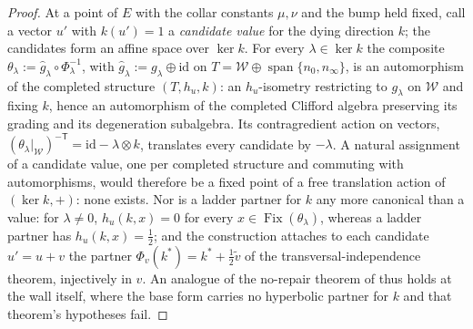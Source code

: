 \documentclass[11pt]{article}
\theoremstyle{definition}
\theoremstyle{plain}
\providecommand{\id}{}\renewcommand{\id}{\mathrm{id}}
\providecommand{\nInf}{}\renewcommand{\nInf}{n_\infty}
\providecommand{\nO}{}\renewcommand{\nO}{n_0}
\providecommand{\shW}{}\renewcommand{\shW}{\mathcal{W}}
\begin{document}
\begin{proof}
At a point of $E$ with the collar constants $\mu, \nu$ and the bump held fixed, call a vector $u'$ with $k(u') = 1$ a \emph{candidate value} for the dying direction $k$; the candidates form an affine space over $\ker k$. For every $\lambda \in \ker k$ the composite $\theta_\lambda := \hat g_\lambda \circ \Phi_\lambda^{-1}$, with $\hat g_\lambda := g_\lambda \oplus \id$ on $T = \shW \oplus \operatorname{span}\{\nO, \nInf\}$, is an automorphism of the completed structure $(T, h_u, k)$: an $h_u$-isometry restricting to $g_\lambda$ on $\shW$ and fixing $k$, hence an automorphism of the completed Clifford algebra preserving its grading and its degeneration subalgebra. Its contragredient action on vectors, $(\theta_\lambda|_{\shW})^{-\mathsf{T}} = \id - \lambda \otimes k$, translates every candidate by $-\lambda$. A natural assignment of a candidate value, one per completed structure and commuting with automorphisms, would therefore be a fixed point of a free translation action of $(\ker k, +)$: none exists. Nor is a ladder partner for $k$ any more canonical than a value: for $\lambda \neq 0$, $h_u(k, x) = 0$ for every $x \in \operatorname{Fix}(\theta_\lambda)$, whereas a ladder partner has $h_u(k, x) = \tfrac12$; and the construction attaches to each candidate $u' = u + v$ the partner $\Phi_v(k^*) = k^* + \tfrac12\tilde v$ of the transversal-independence theorem, injectively in $v$. An analogue of the no-repair theorem of \cite[Thm.~4.2]{ButlerT1} thus holds at the wall itself, where the base form carries no hyperbolic partner for $k$ and that theorem's hypotheses fail.

\end{proof}
\end{document}
